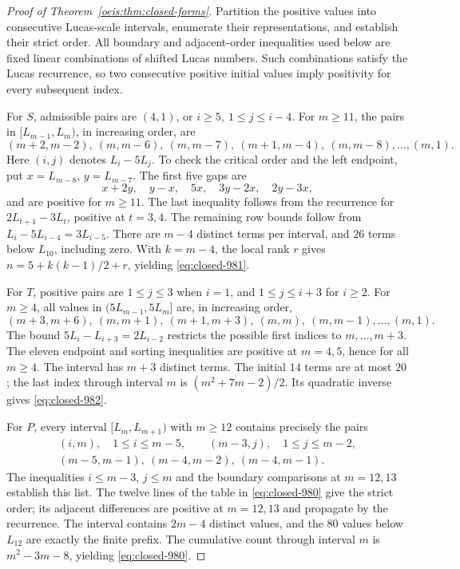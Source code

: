 \documentclass[11pt]{article}
\begin{document}
\begin{proof}[Proof of Theorem~\ref{oeis:thm:closed-forms}]
Partition the positive values into consecutive Lucas-scale
intervals, enumerate their representations, and establish their
strict order. All boundary and adjacent-order inequalities used
below are fixed linear combinations of shifted Lucas numbers.
Such combinations satisfy the Lucas recurrence, so two
consecutive positive initial values imply positivity for
every subsequent index.

For \(S\), admissible pairs are \((4,1)\), or
\(i\ge5,\ 1\le j\le i-4\).
For \(m\ge11\), the pairs in \([L_{m-1},L_m)\),
in increasing order, are
\[
(m+2,m-2),\ (m,m-6),\ (m,m-7),\
(m+1,m-4),\ (m,m-8),\ldots,(m,1).
\]
Here \((i,j)\) denotes \(L_i-5L_j\).
To check the critical order and the left endpoint, put
\(x=L_{m-8}\), \(y=L_{m-7}\). The first five gaps are
\[
x+2y,\quad y-x,\quad5x,\quad3y-2x,\quad2y-3x,
\]
and are positive for \(m\ge11\).
The last inequality follows from the recurrence for
\(2L_{t+1}-3L_t\), positive at \(t=3,4\).
The remaining row bounds follow from
\(L_i-5L_{i-4}=3L_{i-5}\).
There are \(m-4\) distinct terms per interval, and
\(26\) terms below \(L_{10}\), including zero. With
\(k=m-4\), the local rank \(r\) gives
\(n=5+k(k-1)/2+r\), yielding \eqref{eq:closed-981}.

For \(T\), positive pairs are \(1\le j\le3\)
when \(i=1\), and \(1\le j\le i+3\) for \(i\ge2\).
For \(m\ge4\), all values in \((5L_{m-1},5L_m]\)
are, in increasing order,
\[
(m+3,m+6),\ (m,m+1),\ (m+1,m+3),\
(m,m),\ (m,m-1),\ldots,(m,1).
\]
The bound \(5L_i-L_{i+3}=2L_{i-2}\)
restricts the possible first indices to \(m,\ldots,m+3\).
The eleven endpoint and sorting inequalities are positive
at \(m=4,5\), hence for all \(m\ge4\).
The interval has \(m+3\) distinct terms.
The initial \(14\) terms are at most \(20\); the last
index through interval \(m\) is \((m^2+7m-2)/2\).
Its quadratic inverse gives \eqref{eq:closed-982}.

For \(P\), every interval \([L_m,L_{m+1})\)
with \(m\ge12\) contains precisely the pairs
\[
\begin{gathered}
(i,m),\quad1\le i\le m-5,\qquad
(m-3,j),\quad1\le j\le m-2,\\
(m-5,m-1),\ (m-4,m-2),\ (m-4,m-1).
\end{gathered}
\]
The inequalities \(i\le m-3\), \(j\le m\)
and the boundary comparisons at \(m=12,13\)
establish this list. The twelve lines of the
table in \eqref{eq:closed-980} give the strict order;
its adjacent differences are positive at \(m=12,13\)
and propagate by the recurrence.
The interval contains \(2m-4\) distinct values,
and the \(80\) values below \(L_{12}\) are exactly
the finite prefix. The cumulative count through
interval \(m\) is \(m^2-3m-8\), yielding
\eqref{eq:closed-980}.


\end{proof}
\end{document}

